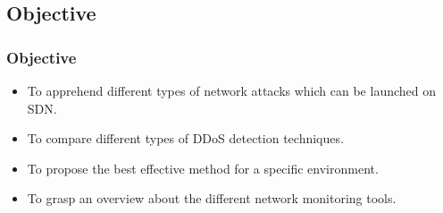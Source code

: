 \documentclass[10pt]{beamer}
\begin{document}

\begin{frame}
\section[]{Objective}
\frametitle{Objective}
\begin{center}
\begin{itemize}
\footnotesize
\item
To apprehend different types of network attacks which can be launched on SDN.
\item
To compare different types of DDoS detection techniques.
\item
To propose the best effective method for a specific environment.
\item
To grasp an overview about the different network monitoring tools.
\end{itemize}
\end{center}
\end{frame}
\end{document}
